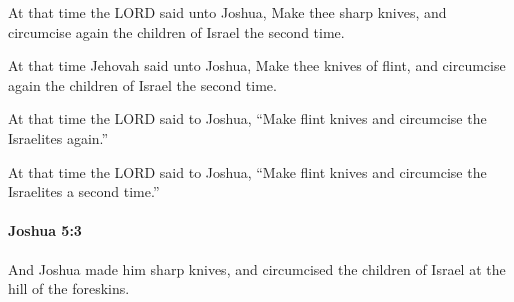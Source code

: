 			At that time the LORD said unto Joshua, Make thee sharp knives, and circumcise again the children of Israel the second time.

			\begin{versebox}
					\item[BHS] 
					\item[ASV] At that time Jehovah said unto Joshua, Make thee knives of flint, and circumcise again the children of Israel the second time.
					\item[NIV] At that time the LORD said to Joshua, “Make flint knives and circumcise the Israelites again.”
					\item[NRSV] At that time the LORD said to Joshua, “Make flint knives and circumcise the Israelites a second time.”
			\end{versebox}

		\paragraph{Joshua 5:3} %
			\label{JOSHUA-5-3}

			And Joshua made him sharp knives, and circumcised the children of Israel at the hill of the foreskins.

